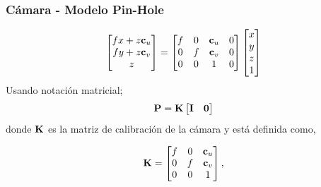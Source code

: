 \begin{frame}
    \frametitle{Cámara - Modelo Pin-Hole}   
    \footnotesize
    \begin{equation}
        \begin{bmatrix}
            fx+z\boldsymbol{\mathbf{c}}_{u}\\
            fy+z\boldsymbol{\mathbf{c}}_{v}\\
            z
        \end{bmatrix}
        =
        \begin{bmatrix}
            f & 0 & \boldsymbol{\mathbf{c}}_{u} & 0\\
            0 & f & \boldsymbol{\mathbf{c}}_{v} & 0\\
            0 & 0 & 1 & 0
        \end{bmatrix}
        \begin{bmatrix}
            x\\
            y\\
            z\\
            1
        \end{bmatrix}
    \end{equation}
    Usando notación matricial;
    \begin{equation*}
        \boldsymbol{\mathbf{P}}=\boldsymbol{\mathbf{K}}\begin{bmatrix} \boldsymbol{\mathbf{I}} & \boldsymbol{\mathbf{0}}\end{bmatrix}
    \end{equation*}
    donde $\boldsymbol{\mathbf{K}}$ es la matriz de calibración de la cámara y está definida como,
    
    \begin{equation*}
        \boldsymbol{\mathbf{K}}=
        \begin{bmatrix}f & 0 & \boldsymbol{\mathbf{c}}_{u}\\
            0 & f & \boldsymbol{\mathbf{c}}_{v}\\
            0 & 0 & 1
        \end{bmatrix},
    \end{equation*}
\end{frame}

